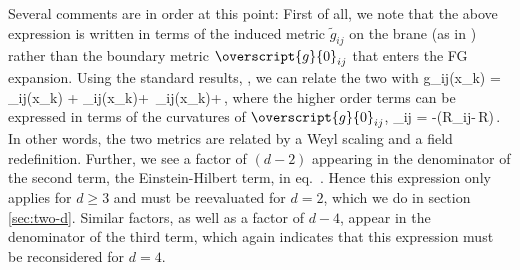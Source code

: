 Several comments are in order at this point: First of all, we note that the above expression is written in terms of the induced metric $\tilde g_{ij}$ on the brane (as in \cite{Emparan:1999pm}) rather than the boundary metric $\overscript{g}{0}_{ij}$ that enters the FG expansion. Using the standard results, \eg \cite{Skenderis:2002wp,deHaro:2000vlm}, we can relate the two with
\beq\label{relate}
\tilde g_{ij}(x_k) = \,_{ij}(x_k) +  _{ij}(x_k)+\, _{ij}(x_k)+\cdots\,,
\eeq
where the higher order terms can be expressed in terms of the curvatures of $\overscript{g}{0}_{ij}$, \eg
\beq\label{oneg}
_{ij} = -\left(R_{ij} -\,R\right)\,.
\eeq
In other words, the two metrics are related by a Weyl scaling and a field redefinition. Further, we see a factor of $(d-2)$ appearing in the denominator of the second term, \ie the Einstein-Hilbert term, in eq.~. Hence this expression only applies for $d\ge3$ and must be reevaluated for $d=2$, which we do in section \ref{sec:two-d}. Similar factors, as well as a factor of $d-4$, appear in the denominator of the third term, which again indicates that this expression must be reconsidered for $d=4$.

